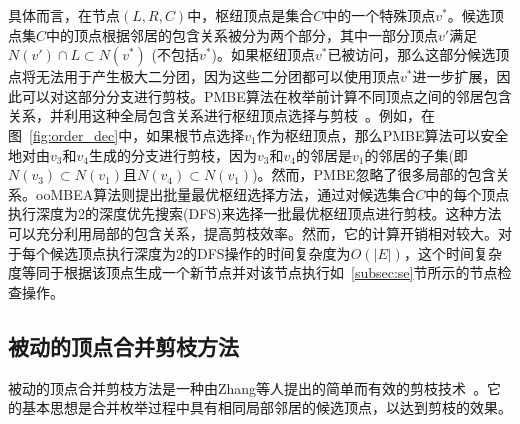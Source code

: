 具体而言，在节点$(L,R,C)$中，枢纽顶点是集合$C$中的一个特殊顶点$v^*$。候选顶点集$C$中的顶点根据邻居的包含关系被分为两个部分，其中一部分顶点$v'$满足$N(v') \cap L \subset N(v^*)$ (不包括$v^*$)。如果枢纽顶点$v^*$已被访问，那么这部分候选顶点将无法用于产生极大二分团，因为这些二分团都可以使用顶点$v^*$进一步扩展，因此可以对这部分分支进行剪枝。PMBE算法在枚举前计算不同顶点之间的邻居包含关系，并利用这种全局包含关系进行枢纽顶点选择与剪枝~\cite{PMBE20}。例如，在图~\ref{fig:order_dec}中，如果根节点选择$v_1$作为枢纽顶点，那么PMBE算法可以安全地对由$v_3$和$v_4$生成的分支进行剪枝，因为$v_3$和$v_4$的邻居是$v_1$的邻居的子集(即$N(v_3)\subset N(v_1)$且$N(v_4)\subset N(v_1)$)。然而，PMBE忽略了很多局部的包含关系。ooMBEA算法则提出批量最优枢纽选择方法，通过对候选集合$C$中的每个顶点执行深度为2的深度优先搜索(DFS)来选择一批最优枢纽顶点进行剪枝。这种方法可以充分利用局部的包含关系，提高剪枝效率。然而，它的计算开销相对较大。对于每个候选顶点执行深度为2的DFS操作的时间复杂度为$O(|E|)$，这个时间复杂度等同于根据该顶点生成一个新节点并对该节点执行如~\ref{subsec:se}节所示的节点检查操作。



\subsection{被动的顶点合并剪枝方法}
\label{subsec:pmp}

被动的顶点合并剪枝方法是一种由Zhang等人提出的简单而有效的剪枝技术~\cite{iMBEA14}。它的基本思想是合并枚举过程中具有相同局部邻居的候选顶点，以达到剪枝的效果。

